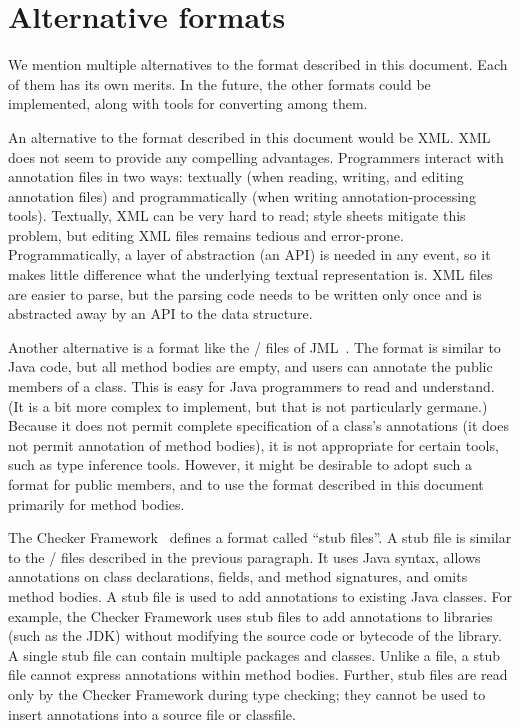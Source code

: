 \documentclass{article}
\newcommand{\code}[1]{\ifmmode{\mbox{\relax\ttfamily{#1}}}\else{\relax\ttfamily #1}\fi}
\newcommand{\code}[1]{\texttt{#1}}
\begin{document}
\section{Alternative formats}\label{alternative-formats}

We mention multiple alternatives to the format described in this document.
Each of them has its own merits.
In the future, the other formats could be implemented, along with tools for
converting among them.



An alternative to the format described in this document would be XML\@.
XML does not seem to provide any compelling advantages.  Programmers
interact with annotation files in two ways:  textually (when reading, writing,
and editing annotation files) and programmatically (when writing
annotation-processing tools).  Textually, XML can be
very hard to read; style sheets mitigate this
problem, but editing XML files remains tedious and error-prone.
Programmatically, a layer of abstraction (an API) is needed in any event, so it
makes little difference what the underlying textual representation is.
XML files are easier to parse, but the parsing code needs to be
written only once and is abstracted away by an API to the data structure.


Another alternative is a format like the \code{.spec}/\code{.jml} files
of JML~\cite{LeavensBR2006:JML}.  The format is similar to Java code, but
all method bodies are empty, and users can annotate the public members of a
class.  This is easy for Java programmers to read and understand.  (It is a
bit more complex to implement, but that is not particularly germane.)
Because it does not permit complete specification of a class's annotations
(it does not permit annotation of method bodies), it is not appropriate for
certain tools, such as type inference tools.  However, it might be desirable
to adopt such a format for public members, and to use the format
described in this document primarily for method bodies.


The Checker Framework~\cite{DietlDEMS2011,CF} defines a format
called ``stub files''. A stub file is similar
to the \code{.spec}/\code{.jml} files described in the previous paragraph. It
uses Java syntax, allows annotations on class declarations, fields, and method
signatures, and omits method bodies. A stub file is used to add annotations to
existing Java classes. For example, the Checker Framework uses stub files to add
annotations to libraries (such as the JDK) without modifying
the source code or bytecode of the library. A single stub file can contain
multiple packages and classes. Unlike a \code{.jaif} file, a stub file cannot
express annotations within method bodies. Further, stub files are read only by
the Checker Framework during type checking; they cannot be used to insert
annotations into a source file or classfile.
\end{document}
